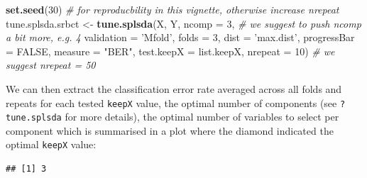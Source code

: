 \documentclass[]{book}
\newenvironment{Shaded}{\begin{snugshade}}{\end{snugshade}}
\newcommand{\CommentTok}[1]{\textcolor[rgb]{0.56,0.35,0.01}{\textit{#1}}}
\newcommand{\DataTypeTok}[1]{\textcolor[rgb]{0.13,0.29,0.53}{#1}}
\newcommand{\DecValTok}[1]{\textcolor[rgb]{0.00,0.00,0.81}{#1}}
\newcommand{\KeywordTok}[1]{\textcolor[rgb]{0.13,0.29,0.53}{\textbf{#1}}}
\newcommand{\NormalTok}[1]{#1}
\newcommand{\OperatorTok}[1]{\textcolor[rgb]{0.81,0.36,0.00}{\textbf{#1}}}
\newcommand{\OtherTok}[1]{\textcolor[rgb]{0.56,0.35,0.01}{#1}}
\newcommand{\StringTok}[1]{\textcolor[rgb]{0.31,0.60,0.02}{#1}}
\begin{document}
\begin{Shaded}
\begin{Highlighting}[]
\KeywordTok{set.seed}\NormalTok{(}\DecValTok{30}\NormalTok{) }\CommentTok{# for reproducbility in this vignette, otherwise increase nrepeat}
\NormalTok{tune.splsda.srbct <-}\StringTok{ }\KeywordTok{tune.splsda}\NormalTok{(X, Y, }\DataTypeTok{ncomp =} \DecValTok{3}\NormalTok{, }\CommentTok{# we suggest to push ncomp a bit more, e.g. 4}
                                 \DataTypeTok{validation =} \StringTok{'Mfold'}\NormalTok{,}
                                 \DataTypeTok{folds =} \DecValTok{3}\NormalTok{, }\DataTypeTok{dist =} \StringTok{'max.dist'}\NormalTok{, }\DataTypeTok{progressBar =} \OtherTok{FALSE}\NormalTok{,}
                                 \DataTypeTok{measure =} \StringTok{"BER"}\NormalTok{, }\DataTypeTok{test.keepX =}\NormalTok{ list.keepX,}
                                 \DataTypeTok{nrepeat =} \DecValTok{10}\NormalTok{)   }\CommentTok{# we suggest nrepeat = 50}
\end{Highlighting}
\end{Shaded}

We can then extract the classification error rate averaged across all folds and repeats for each tested \texttt{keepX} value, the optimal number of components (see \texttt{?tune.splsda} for more details), the optimal number of variables to select per component which is summarised in a plot where the diamond indicated the optimal \texttt{keepX} value:

\begin{Shaded}
\end{Shaded}

\begin{verbatim}
## [1] 3
\end{verbatim}

\begin{Shaded}
\end{Shaded}
\end{document}
